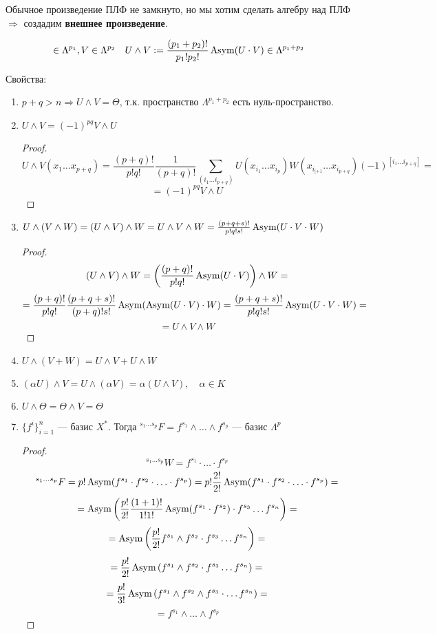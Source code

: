 Обычное произведение ПЛФ не замкнуто, но мы хотим сделать алгебру над ПЛФ \(\Rightarrow\) создадим \textbf{внешнее произведение}.

\[\in \Lambda^{p_1}, V\in \Lambda^{p_2} \quad U\wedge V := \frac{(p_1+p_2)!}{p_1!p_2!} \operatorname{\text{Asym}} (U\cdot V) \in \Lambda^{p_1+p_2}\]

Свойства:
\begin{enumerate}
    \item $p+q>n\Rightarrow U\wedge V=\Theta$, т.к. пространство \(\Lambda^{p_1+p_2}\) есть нуль-пространство.
    \item $U\wedge V=(-1)^{pq} V\wedge U$
          \begin{proof}
              \[U\wedge V(x_1\ldots x_{p+q})=\frac{(p+q)!}{p!q!}\frac{1}{(p+q)!}\sum\limits_{(i_1\ldots i_{p+q})} U(x_{i_1}\ldots x_{i_p}) W(x_{i_{[+1}}\ldots x_{i_{p+q}})(-1)^{[i_1\ldots i_{p+q}]}=\]\[=(-1)^{pq} V\wedge U\]
          \end{proof}
    \item $U\wedge (V\wedge W)=(U\wedge V)\wedge W=U\wedge V\wedge W=\frac{(p+q+s)!}{p!q!s!}\operatorname{\text{Asym}}(U\cdot V\cdot W)$
          \begin{proof}
              \[(U\wedge V)\wedge W=\left(\frac{(p+q)!}{p!q!}\operatorname{\text{Asym}} (U\cdot V)\right)\wedge W=\]
              \[=\frac{(p+q)!}{p!q!}\frac{(p+q+s)!}{(p+q)!s!} \operatorname{\text{Asym}}(\operatorname{\text{Asym}}(U\cdot V)\cdot W)=\frac{(p+q+s)!}{p!q!s!}\operatorname{\text{Asym}}(U\cdot V\cdot W)=\]
              \[=U\wedge V\wedge W\]
          \end{proof}
    \item $U\wedge (V+W)=U\wedge V + U\wedge W$
    \item $(\alpha U)\wedge V=U\wedge (\alpha V)=\alpha(U\wedge V),\quad \alpha\in K$
    \item $U\wedge\Theta=\Theta\wedge V=\Theta$
    \item $\{f^i\}_{i=1}^n$ --- базис $X^*$. Тогда \({}^{s_1\ldots s_p}F=f^{s_1}\wedge\ldots\wedge f^{s_p}\) --- базис \(\Lambda^p\)
          \begin{proof}
              \[{}^{s_1\ldots s_p} W=f^{s_1}\cdot \ldots \cdot f^{s_p}\]
              \[{}^{s_1\ldots s_p} F=p!\operatorname{\text{Asym}}(f^{s_1}\cdot f^{s_2} \cdot \ldots \cdot f^{s_p})=p!\frac{2!}{2!} \operatorname{\text{Asym}}(f^{s_1}\cdot f^{s_2} \cdot \ldots \cdot f^{s_p})=\]
              \[=\operatorname{\text{Asym}}\left(\frac{p!}{2!}\frac{(1+1)!}{1!1!}\operatorname{\text{Asym}}(f^{s_1}\cdot f^{s_2}) \cdot f^{s_3}\ldots f^{s_n}\right)=\]
              \[=\operatorname{\text{Asym}}\left(\frac{p!}{2!} f^{s_1}\wedge f^{s_2} \cdot f^{s_3}\ldots f^{s_n}\right)=\]
              \[=\frac{p!}{2!}\operatorname{\text{Asym}}\left( f^{s_1}\wedge f^{s_2} \cdot f^{s_3}\ldots f^{s_n}\right)=\]
              \[=\frac{p!}{3!}\operatorname{\text{Asym}}\left( f^{s_1}\wedge f^{s_2} \wedge f^{s_3}\cdot \ldots f^{s_n}\right)=\]
              \[=f^{s_1}\wedge\ldots\wedge f^{s_p}\]
          \end{proof}
\end{enumerate}

